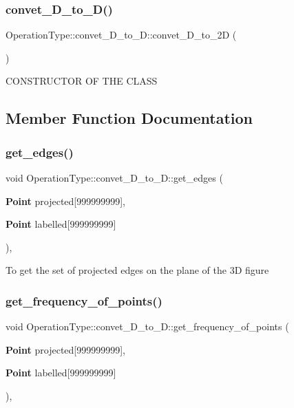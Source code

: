 \subsubsection{convet\+\_\+D\+\_\+to\+\_\+D()}
{\footnotesize\ttfamily Operation\+Type\+::convet\+\_\+D\+\_\+to\+\_\+D\+::convet\+\_\+D\+\_\+to\+\_\+2D (\begin{DoxyParamCaption}{ }\end{DoxyParamCaption})\hspace{0.3cm}{\ttfamily [private]}}

C\+O\+N\+S\+T\+R\+U\+C\+T\+OR OF T\+HE C\+L\+A\+SS 

\subsection{Member Function Documentation}
\mbox{\label{class_operation_type_1_1convet__3_d__to__2_d_aac516b207c5ea000db6fb668e74d6efb}} 
\subsubsection{get\+\_\+edges()}
{\footnotesize\ttfamily void Operation\+Type\+::convet\+\_\+D\+\_\+to\+\_\+D\+::get\+\_\+edges (\begin{DoxyParamCaption}\item[{\textbf{ Point}}]{projected[999999999],  }\item[{\textbf{ Point}}]{labelled[999999999] }\end{DoxyParamCaption})\hspace{0.3cm}{\ttfamily [inline]}, {\ttfamily [private]}}

To get the set of projected edges on the plane of the 3D figure \mbox{\label{class_operation_type_1_1convet__3_d__to__2_d_a147551d3fc9bc03de11601d64999cccf}} 
\subsubsection{get\+\_\+frequency\+\_\+of\+\_\+points()}
{\footnotesize\ttfamily void Operation\+Type\+::convet\+\_\+D\+\_\+to\+\_\+D\+::get\+\_\+frequency\+\_\+of\+\_\+points (\begin{DoxyParamCaption}\item[{\textbf{ Point}}]{projected[999999999],  }\item[{\textbf{ Point}}]{labelled[999999999] }\end{DoxyParamCaption})\hspace{0.3cm}{\ttfamily [inline]}, {\ttfamily [private]}}


